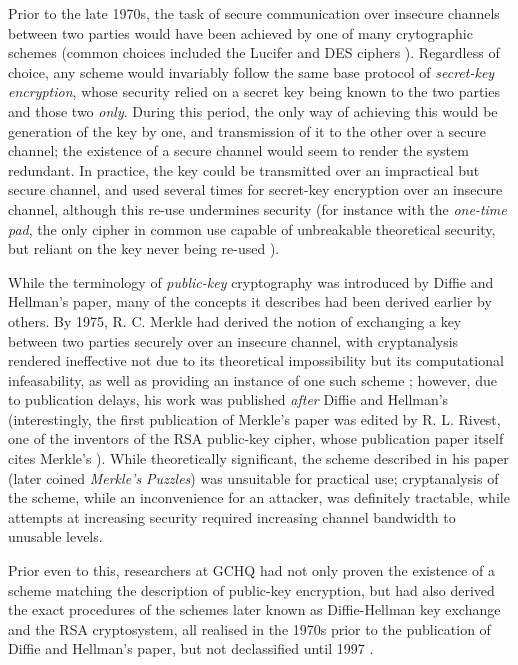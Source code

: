 \documentclass[11pt]{article}
\begin{document}
Prior to the late 1970s, the task of secure communication over insecure channels
between two parties would have been achieved by one of many crytographic schemes
(common choices included the Lucifer and DES ciphers \cite{delfs2007symmetric}).
Regardless of choice, any scheme would invariably follow the same base 
protocol of \textit{secret-key encryption}, whose security relied on a
secret key being known to the two parties and those two \textit{only}. During
this period, the only way of achieving this would be generation of the key by
one, and transmission of it to the other over a secure channel; the existence of
a secure channel would seem to render the system redundant. In practice, the key
could be transmitted over an impractical but secure channel, and used several
times for secret-key encryption over an insecure channel, although this re-use
undermines security (for instance with the \textit{one-time pad}, the only
cipher in common use capable of unbreakable theoretical security, but reliant
on the key never being re-used \cite{delfs2007symmetric}).
\par
While the terminology of \textit{public-key} cryptography was introduced by
Diffie and Hellman's paper, many of the concepts it describes had been derived
earlier by others. By 1975, R. C. Merkle had derived the notion of exchanging a
key between two parties securely over an insecure channel, with cryptanalysis
rendered ineffective not due to its theoretical impossibility but its
computational infeasability, as well as providing an instance of one such scheme
\cite{merkle1978secure}; however, due to publication delays, his work was
published \textit{after} Diffie and Hellman's (interestingly, the first
publication of Merkle's paper was edited by R. L.  Rivest, one of the inventors
of the RSA public-key cipher, whose publication paper itself cites Merkle's
\cite{rivest1978method}). While theoretically significant, the scheme described
in his paper (later coined \textit{Merkle's Puzzles}) was unsuitable for
practical use; cryptanalysis of the scheme, while an inconvenience for an
attacker, was definitely tractable, while attempts at increasing security
required increasing channel bandwidth to unusable levels. 
\par
Prior even to this, researchers at GCHQ had not only proven the existence of a
scheme matching the description of public-key encryption, but had also derived
the exact procedures of the schemes later known as Diffie-Hellman key exchange
and the RSA cryptosystem, all realised in the 1970s prior to the publication of
Diffie and Hellman's paper, but not declassified until 1997
\cite{ellis1987story}.
\end{document}
